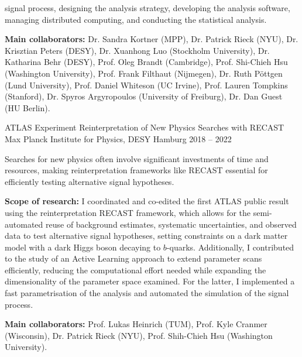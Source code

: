 \begin{cventries}
{\begin{cvitems}
        signal process, designing the analysis strategy, developing the analysis software, managing
        distributed computing, and conducting the statistical analysis.
        \item \textbf{Main collaborators:} Dr. Sandra Kortner (MPP), Dr. Patrick Rieck (NYU), Dr. Krisztian Peters (DESY), Dr. Xuanhong Luo (Stockholm University), Dr. Katharina Behr (DESY), Prof. Oleg Brandt (Cambridge), Prof. Shi-Chieh Hsu (Washington University), Prof. Frank Filthaut
        (Nijmegen), Dr. Ruth Pöttgen (Lund University), Prof. Daniel Whiteson (UC Irvine), Prof. Lauren Tompkins (Stanford), Dr. Spyros Argyropoulos (University of Freiburg), Dr. Dan Guest (HU Berlin).
      \end{cvitems}
    }

  \cventry
    {ATLAS Experiment} %
    {Reinterpretation of New Physics Searches with RECAST} %
    {Max Planck Institute for Physics, DESY Hamburg} %
    {2018 -- 2022} %
    {
      \begin{cvitems} %
        \item {Searches for new physics often involve significant investments of time and resources, making reinterpretation frameworks like RECAST essential for efficiently testing alternative signal hypotheses.}
        \item \textbf{Scope of research:} I coordinated and co-edited the first ATLAS public result using the reinterpretation RECAST framework, which allows for the semi-automated reuse of background estimates,
        systematic uncertainties, and observed data to test alternative signal hypotheses, setting
        constraints on a dark matter model with a dark Higgs boson decaying to \(b\)-quarks.
        Additionally, I contributed to the study of an Active Learning approach to extend parameter
        scans efficiently, reducing the computational effort needed while expanding the dimensionality
        of the parameter space examined. For the latter, I implemented a fast parametrisation of the
        analysis and automated the simulation of the signal process.
        \item \textbf{Main collaborators:} Prof. Lukas Heinrich (TUM), Prof. Kyle Cranmer (Wisconsin),
        Dr. Patrick Rieck (NYU), Prof. Shih-Chieh Hsu (Washington University).
      \end{cvitems}
    }


\end{cventries}
